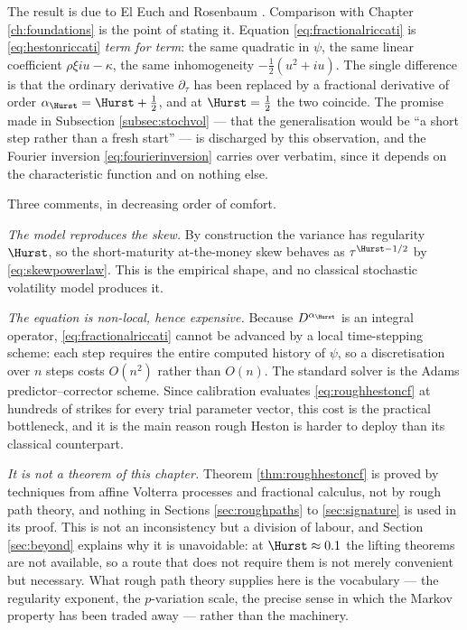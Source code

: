 The result is due to El Euch and Rosenbaum \cite{eleucrosenbaum2019}. Comparison with Chapter
\ref{ch:foundations} is the point of stating it. Equation \eqref{eq:fractionalriccati} is
\eqref{eq:hestonriccati} \emph{term for term}: the same quadratic in $\psi$, the same linear
coefficient $\rho\xi iu - \kappa$, the same inhomogeneity $-\tfrac12(u^2+iu)$. The single
difference is that the ordinary derivative $\partial_\tau$ has been replaced by a fractional
derivative of order $\alpha_\Hurst = \Hurst+\tfrac12$, and at $\Hurst = \tfrac12$ the two coincide.
The promise made in Subsection \ref{subsec:stochvol} --- that the generalisation would be ``a short
step rather than a fresh start'' --- is discharged by this observation, and the Fourier inversion
\eqref{eq:fourierinversion} carries over verbatim, since it depends on the characteristic function
and on nothing else.

\begin{remark}\label{rem:roughhestoncost}
Three comments, in decreasing order of comfort.

\emph{The model reproduces the skew.} By construction the variance has regularity $\Hurst$, so the
short-maturity at-the-money skew behaves as $\tau^{\Hurst-1/2}$ by \eqref{eq:skewpowerlaw}. This is
the empirical shape, and no classical stochastic volatility model produces it.

\emph{The equation is non-local, hence expensive.} Because $D^{\alpha_\Hurst}$ is an integral
operator, \eqref{eq:fractionalriccati} cannot be advanced by a local time-stepping scheme: each
step requires the entire computed history of $\psi$, so a discretisation over $n$ steps costs
$O(n^2)$ rather than $O(n)$. The standard solver is the Adams predictor--corrector scheme. Since
calibration evaluates \eqref{eq:roughhestoncf} at hundreds of strikes for every trial parameter
vector, this cost is the practical bottleneck, and it is the main reason rough Heston is harder to
deploy than its classical counterpart.

\emph{It is not a theorem of this chapter.} Theorem \ref{thm:roughhestoncf} is proved by
techniques from affine Volterra processes and fractional calculus, not by rough path theory, and
nothing in Sections \ref{sec:roughpaths} to \ref{sec:signature} is used in its proof. This is not
an inconsistency but a division of labour, and Section \ref{sec:beyond} explains why it is
unavoidable: at $\Hurst\approx0.1$ the lifting theorems are not available, so a route that does not
require them is not merely convenient but necessary. What rough path theory supplies here is the
vocabulary --- the regularity exponent, the $p$-variation scale, the precise sense in which the
Markov property has been traded away --- rather than the machinery.
\end{remark}




